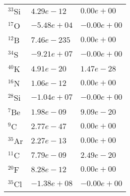 \begin{tabular}{lll}
 $^{33}$Si & $4.29e-12 $                                                        & $0.00e+00 $                                                                     \\
 $^{17}$O  & $-5.48e+04 $                                                       & $-0.00e+00 $                                                                    \\
 $^{12}$B  & $7.46e-235 $                                                       & $0.00e+00 $                                                                     \\
 $^{34}$S  & $-9.21e+07 $                                                       & $-0.00e+00 $                                                                    \\
 $^{40}$K  & $4.91e-20 $                                                        & $1.47e-28 $                                                                     \\
 $^{16}$N  & $1.06e-12 $                                                        & $0.00e+00 $                                                                     \\
 $^{28}$Si & $-1.04e+07 $                                                       & $-0.00e+00 $                                                                    \\
 $^{7}$Be  & $1.98e-09 $                                                        & $9.09e-20 $                                                                     \\
 $^{9}$C   & $2.77e-47 $                                                        & $0.00e+00 $                                                                     \\
 $^{35}$Ar & $2.27e-13 $                                                        & $0.00e+00 $                                                                     \\
 $^{11}$C  & $7.79e-09 $                                                        & $2.49e-20 $                                                                     \\
 $^{20}$F  & $8.28e-12 $                                                        & $0.00e+00 $                                                                     \\
 $^{35}$Cl & $-1.38e+08 $                                                       & $-0.00e+00 $                                                                    \\

\end{tabular}
